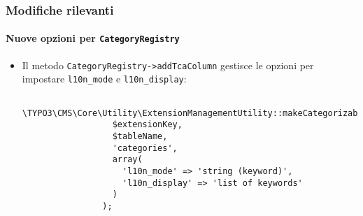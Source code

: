 \begin{frame}[fragile]
	\frametitle{Modifiche rilevanti}
	\framesubtitle{Nuove opzioni per \texttt{CategoryRegistry}}

	\lstset{basicstyle=\tiny\ttfamily}

	\begin{itemize}

		\item Il metodo \texttt{CategoryRegistry->addTcaColumn} gestisce le opzioni per impostare
			\texttt{l10n\_mode} e \texttt{l10n\_display}:

			\begin{lstlisting}
				\TYPO3\CMS\Core\Utility\ExtensionManagementUtility::makeCategorizable(
				  $extensionKey,
				  $tableName,
				  'categories',
				  array(
				    'l10n_mode' => 'string (keyword)',
				    'l10n_display' => 'list of keywords'
				  )
				);
			\end{lstlisting}

	\end{itemize}

\end{frame}


